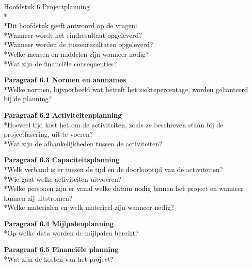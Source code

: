 \documentclass{article}
\begin{document}
Hoofdstuk 6 Projectplanning
\\*
\\*Dit hoofdstuk geeft antwoord op de vragen:
\\*Wanneer wordt het eindresultaat opgeleverd?
\\*Wanneer worden de tussenresultaten opgeleverd?
\\*Welke mensen en middelen zijn wanneer nodig?
\\*Wat zijn de financiële consequenties?
\newline

\noindent
\textbf{Paragraaf 6.1 Normen en aannames}
\\*Welke normen, bijvoorbeeld wat betreft het ziektepercentage, worden gehanteerd bij de planning?
\newline

\noindent
\textbf{Paragraaf 6.2 Activiteitenplanning}
\\*Hoeveel tijd kost het om de activiteiten, zoals ze beschreven staan bij de projectfasering, uit te voeren?
\\*Wat zijn de afhankelijkheden tussen de activiteiten?
\newline

\noindent
\textbf{Paragraaf 6.3 Capaciteitsplanning}
\\*Welk verband is er tussen de tijd en de doorlooptijd van de activiteiten?
\\*Wie gaat welke activiteiten uitvoeren?
\\*Welke personen zijn er vanaf welke datum nodig binnen het project en wanneer kunnen zij uitstromen?
\\*Welke materialen en welk materieel zijn wanneer nodig?
\newline

\noindent
\textbf{Paragraaf 6.4 Mijlpalenplanning}
\\*Op welke data worden de mijlpalen bereikt?
\newline

\noindent
\textbf{Paragraaf 6.5 Financiële planning}
\\*Wat zijn de kosten van het project?
\end{document}
